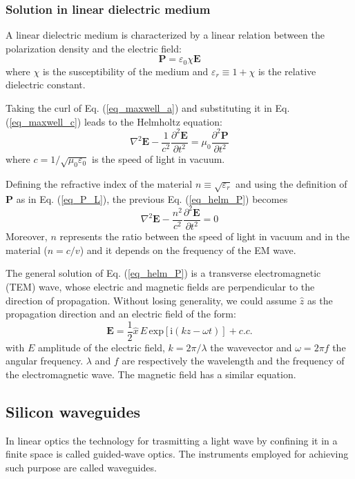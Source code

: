\documentclass[12pt,a4paper,twoside]{article}
\begin{document}
\subsubsection*{Solution in linear dielectric medium}
A linear dielectric medium is characterized by a linear relation between the polarization density and the electric field:
\begin{equation}
	\textbf{P} = \varepsilon_0 \chi \textbf{E}
	\label{eq_P_L}
\end{equation}
where $\chi$ is the susceptibility of the medium and $\varepsilon_r \equiv 1+\chi$ is the relative dielectric constant.

Taking the curl of Eq. (\ref{eq_maxwell_a}) and substituting it in Eq. (\ref{eq_maxwell_c}) leads to the Helmholtz equation:
\begin{equation}
\nabla^2 \textbf{E} - \frac{1}{c^2}\frac{\partial^2 \textbf{E}}{\partial t^2} = \mu_0\frac{\partial^2 \textbf{P}}{\partial t^2}
\label{eq_helm_P}
\end{equation}
where $c = 1/\sqrt{\mu_0 \varepsilon_0}$ is the speed of light in vacuum.

Defining the refractive index of the material $n \equiv \sqrt{\varepsilon_r}$ and using the definition of \textbf{P} as in Eq. (\ref{eq_P_L}), the previous Eq. (\ref{eq_helm_P}) becomes
\begin{equation}
	\nabla^2 \textbf{E} - \frac{n^2}{c^2}\frac{\partial^2 \textbf{E}}{\partial t^2} = 0
	\label{eq_helm_lin}
\end{equation}
Moreover, $n$ represents the ratio between the speed of light in vacuum and in the material ($n = c/v$) and it depends on the frequency of the EM wave.

The general solution of Eq. (\ref{eq_helm_P}) is a transverse electromagnetic (TEM) wave, whose electric and magnetic fields are perpendicular to the direction of propagation.
Without losing generality, we could assume $\hat{z}$ as the propagation direction and an electric field of the form:
\begin{equation}
	\textbf{E} = \frac{1}{2}\hat{x}\,E\,\mathrm{exp}[\mathrm{i}(kz-\omega t)] + c.c.
	\label{eq_wave}
\end{equation}
with $E$ amplitude of the electric field, $k = 2\pi/\lambda$ the wavevector and $\omega = 2\pi f$ the angular frequency.
$\lambda$ and $f$ are respectively the wavelength and the frequency of the electromagnetic wave.
The magnetic field has a similar equation.

\subsection{Silicon waveguides}
In linear optics the technology for trasmitting a light wave by confining it in a finite space is called guided-wave optics.
The instruments employed for achieving such purpose are called waveguides.
\end{document}
